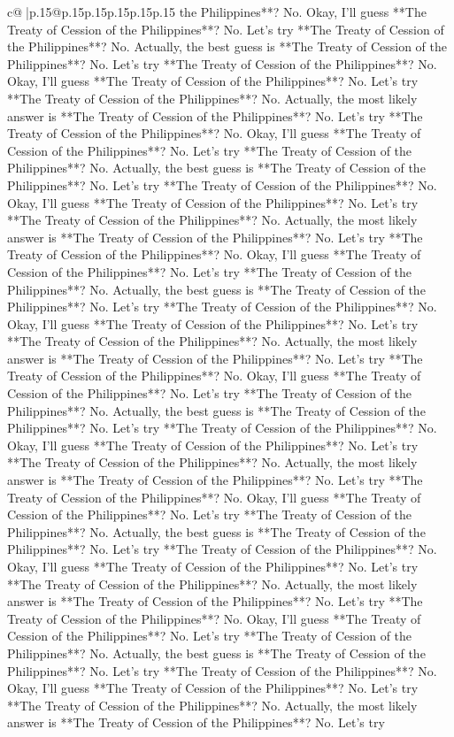 \documentclass{article}
\begin{document}
{\begin{supertabular}{c@{$\;$}|p{.15\linewidth}@{}p{.15\linewidth}p{.15\linewidth}p{.15\linewidth}p{.15\linewidth}p{.15\linewidth}}
{{{the Philippines**? No. Okay, I'll guess **The Treaty of Cession of the Philippines**? No. Let's try **The Treaty of Cession of the Philippines**? No. Actually, the best guess is **The Treaty of Cession of the Philippines**? No. Let's try **The Treaty of Cession of the Philippines**? No. Okay, I'll guess **The Treaty of Cession of the Philippines**? No. Let's try **The Treaty of Cession of the Philippines**? No. Actually, the most likely answer is **The Treaty of Cession of the Philippines**? No. Let's try **The Treaty of Cession of the Philippines**? No. Okay, I'll guess **The Treaty of Cession of the Philippines**? No. Let's try **The Treaty of Cession of the Philippines**? No. Actually, the best guess is **The Treaty of Cession of the Philippines**? No. Let's try **The Treaty of Cession of the Philippines**? No. Okay, I'll guess **The Treaty of Cession of the Philippines**? No. Let's try **The Treaty of Cession of the Philippines**? No. Actually, the most likely answer is **The Treaty of Cession of the Philippines**? No. Let's try **The Treaty of Cession of the Philippines**? No. Okay, I'll guess **The Treaty of Cession of the Philippines**? No. Let's try **The Treaty of Cession of the Philippines**? No. Actually, the best guess is **The Treaty of Cession of the Philippines**? No. Let's try **The Treaty of Cession of the Philippines**? No. Okay, I'll guess **The Treaty of Cession of the Philippines**? No. Let's try **The Treaty of Cession of the Philippines**? No. Actually, the most likely answer is **The Treaty of Cession of the Philippines**? No. Let's try **The Treaty of Cession of the Philippines**? No. Okay, I'll guess **The Treaty of Cession of the Philippines**? No. Let's try **The Treaty of Cession of the Philippines**? No. Actually, the best guess is **The Treaty of Cession of the Philippines**? No. Let's try **The Treaty of Cession of the Philippines**? No. Okay, I'll guess **The Treaty of Cession of the Philippines**? No. Let's try **The Treaty of Cession of the Philippines**? No. Actually, the most likely answer is **The Treaty of Cession of the Philippines**? No. Let's try **The Treaty of Cession of the Philippines**? No. Okay, I'll guess **The Treaty of Cession of the Philippines**? No. Let's try **The Treaty of Cession of the Philippines**? No. Actually, the best guess is **The Treaty of Cession of the Philippines**? No. Let's try **The Treaty of Cession of the Philippines**? No. Okay, I'll guess **The Treaty of Cession of the Philippines**? No. Let's try **The Treaty of Cession of the Philippines**? No. Actually, the most likely answer is **The Treaty of Cession of the Philippines**? No. Let's try **The Treaty of Cession of the Philippines**? No. Okay, I'll guess **The Treaty of Cession of the Philippines**? No. Let's try **The Treaty of Cession of the Philippines**? No. Actually, the best guess is **The Treaty of Cession of the Philippines**? No. Let's try **The Treaty of Cession of the Philippines**? No. Okay, I'll guess **The Treaty of Cession of the Philippines**? No. Let's try **The Treaty of Cession of the Philippines**? No. Actually, the most likely answer is **The Treaty of Cession of the Philippines**? No. Let's try }}}
\end{supertabular}}
\end{document}
